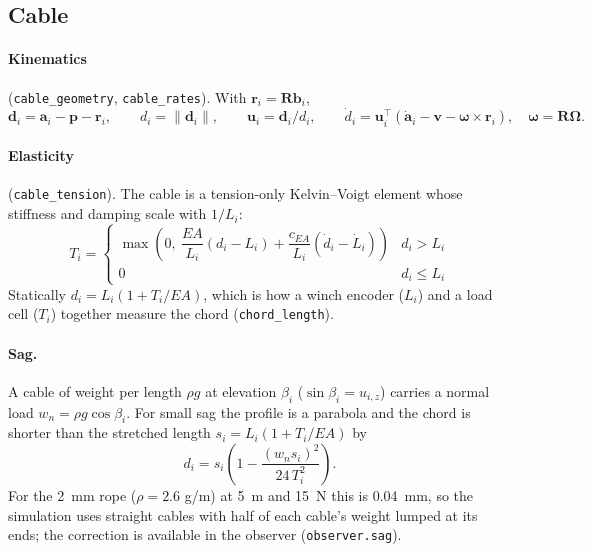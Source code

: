\documentclass[11pt,a4paper]{article}
\newcommand{\T}{^{\!\top}}
\begin{document}
\subsection{Cable}\label{sec:cable}
\paragraph{Kinematics} (\texttt{cable\_geometry}, \texttt{cable\_rates}). With $\bm r_i=\bm R\bm b_i$,
\begin{equation}
 \bm d_i=\bm a_i-\bm p-\bm r_i,\qquad d_i=\|\bm d_i\|,\qquad \bm u_i=\bm d_i/d_i,\qquad
 \dot d_i=\bm u_i\T\!\left(\dot{\bm a}_i-\bm v-\bm\omega\times\bm r_i\right),\quad \bm\omega=\bm R\bm\Omega .
 \label{eq:kin}
\end{equation}
\paragraph{Elasticity} (\texttt{cable\_tension}). The cable is a tension-only Kelvin--Voigt element whose
stiffness and damping scale with $1/L_i$:
\begin{equation}
 T_i=\begin{cases}\max\!\left(0,\ \dfrac{EA}{L_i}(d_i-L_i)+\dfrac{c_{EA}}{L_i}(\dot d_i-\dot L_i)\right) & d_i>L_i\\[2mm]
 0 & d_i\le L_i \end{cases}
 \label{eq:kv}
\end{equation}
Statically $d_i=L_i(1+T_i/EA)$, which is how a winch encoder ($L_i$) and a load cell ($T_i$) together measure the
chord (\texttt{chord\_length}).
\paragraph{Sag.} A cable of weight per length $\rho g$ at elevation $\beta_i$ ($\sin\beta_i=u_{i,z}$) carries a
normal load $w_n=\rho g\cos\beta_i$. For small sag the profile is a parabola and the chord is shorter than the
stretched length $s_i=L_i(1+T_i/EA)$ by
\begin{equation} d_i=s_i\left(1-\frac{(w_n s_i)^2}{24\,T_i^2}\right). \end{equation}
For the 2~mm rope ($\rho=2.6$ g/m) at 5~m and 15~N this is 0.04~mm, so the simulation uses straight cables with
half of each cable's weight lumped at its ends; the correction is available in the observer
(\texttt{observer.sag}).
\end{document}
